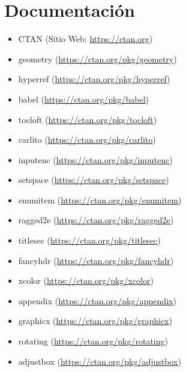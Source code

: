         \section{Documentación}
            \begin{itemize} [label=•]
                \setlength{\itemindent}{3em}
                \item CTAN (Sitio Web: \href{https://ctan.org}{https://ctan.org})
                \item geometry (\href{https://ctan.org/pkg/geometry}{https://ctan.org/pkg/geometry})
                \item hyperref (\href{https://ctan.org/pkg/hyperref}{https://ctan.org/pkg/hyperref})
                \item babel (\href{https://ctan.org/pkg/babel}{https://ctan.org/pkg/babel})
                \item tocloft (\href{https://ctan.org/pkg/hyperref}{https://ctan.org/pkg/tocloft})
                \item carlito (\href{https://ctan.org/pkg/carlito}{https://ctan.org/pkg/carlito})
                \item inputenc (\href{https://ctan.org/pkg/inputenc}{https://ctan.org/pkg/inputenc})
                \item setspace (\href{https://ctan.org/pkg/setspace}{https://ctan.org/pkg/setspace})
                \item enumitem (\href{https://ctan.org/pkg/enumitem}{https://ctan.org/pkg/enumitem})
                \item ragged2e (\href{https://ctan.org/pkg/ragged2e}{https://ctan.org/pkg/ragged2e})
                \item titlesec (\href{https://ctan.org/pkg/titlesec}{https://ctan.org/pkg/titlesec})
                \item fancyhdr (\href{https://ctan.org/pkg/fancyhdr}{https://ctan.org/pkg/fancyhdr})
                \item xcolor (\href{https://ctan.org/pkg/xcolor}{https://ctan.org/pkg/xcolor})
                \item appendix (\href{https://ctan.org/pkg/appendix}{https://ctan.org/pkg/appendix})
                \item graphicx (\href{https://ctan.org/pkg/graphicx}{https://ctan.org/pkg/graphicx})
                \item rotating (\href{https://ctan.org/pkg/rotating}{https://ctan.org/pkg/rotating})
                \item adjustbox (\href{https://ctan.org/pkg/adjustbox}{https://ctan.org/pkg/adjustbox})

\end{itemize}
